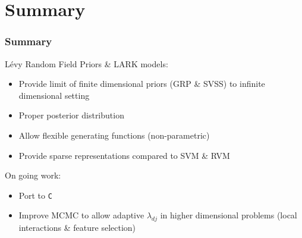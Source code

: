 \documentclass[dvips]{beamer}
\newcommand{\bs}[2]{\begin{frame} \frametitle{#1} 
{#2}
\end{frame} }
\begin{document}
\section{Summary}
\bs{Summary} {
L\'evy Random Field Priors \& LARK models: 
  \begin{itemize}
  \item Provide limit of finite dimensional priors (GRP \& SVSS) to infinite
  dimensional setting
  \item Proper posterior distribution
  \item Allow flexible generating functions (non-parametric)
  \item Provide sparse representations compared to SVM \& RVM
  \end{itemize}
On going work:

\begin{itemize}
\item Port to {\tt C} 
\item Improve MCMC to allow adaptive $\lambda_{dj}$ in higher
dimensional problems  (local interactions \& feature selection)
\end{itemize}


}
\end{document}
